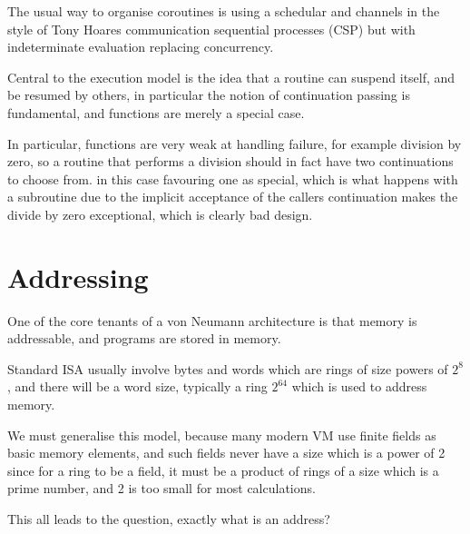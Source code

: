 \documentclass[oneside]{book}
\theoremstyle{plain}
\theoremstyle{definition}
\theoremstyle{plain}
\begin{document}
The usual way to organise coroutines is using a schedular and channels in the style
of Tony Hoares communication sequential processes (CSP) but with indeterminate
evaluation replacing concurrency.

Central to the execution model is the idea that a routine can suspend itself,
and be resumed by others, in particular the notion of continuation passing
is fundamental, and functions are merely a special case.

In particular, functions are very weak at handling failure, for example
division by zero, so a routine that performs a division should in fact
have two continuations to choose from.  in this case favouring one
as special, which is what happens with a subroutine due to the implicit
acceptance of the callers continuation makes the divide by zero exceptional,
which is clearly bad design.

\chapter{Addressing}
One of the core tenants of a von Neumann architecture is that memory is
addressable, and programs are stored in memory.

Standard ISA usually involve bytes and words which are rings of size powers of $2^8$,
and there will be a word size, typically a ring $2^64$ which is used to address memory.

We must generalise this model, because many modern VM use finite fields as basic
memory elements, and such fields never have a size which is a power of 2 since
for a ring to be a field, it must be a product of rings of a size which is a prime number,
and 2 is too small for most calculations.

This all leads to the question, exactly what is an address?
\end{document}

